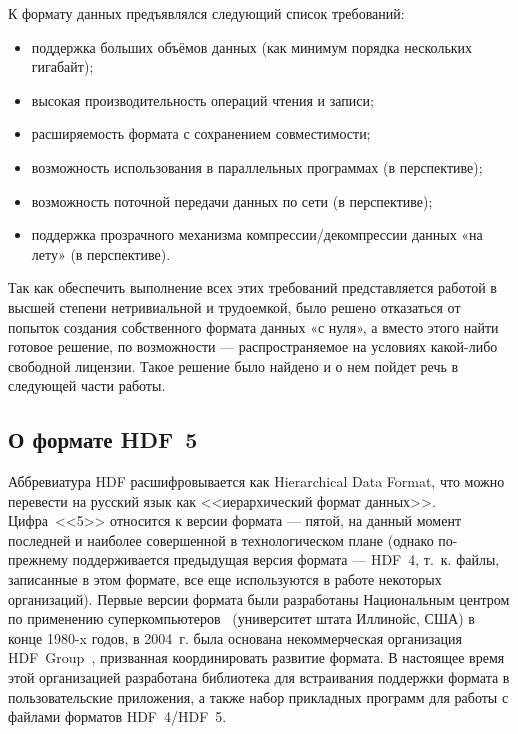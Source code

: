 К формату данных предъявлялся следующий список требований:
\begin{itemize}
\item поддержка больших объёмов данных (как минимум порядка нескольких
      гигабайт);
\item высокая производительность операций чтения и записи;
\item расширяемость формата с сохранением совместимости;
\item возможность использования в параллельных программах (в перспективе);
\item возможность поточной передачи данных по сети (в перспективе);
\item поддержка прозрачного механизма компрессии/декомпрессии данных «на лету»
      (в перспективе).
\end{itemize}

Так как обеспечить выполнение всех этих требований представляется работой
в высшей степени нетривиальной и трудоемкой, было решено отказаться от попыток
создания собственного формата данных «с нуля», а вместо этого найти готовое
решение, по возможности --- распространяемое на условиях какой-либо свободной
лицензии. Такое решение было найдено и о нем пойдет речь в следующей части
работы.


\subsection{О формате HDF~5}

Аббревиатура HDF расшифровывается как Hierarchical Data Format, что можно
перевести на русский язык как <<иерархический формат данных>>. Цифра~<<5>>
относится к версии формата --- пятой, на данный момент последней и наиболее
совершенной в технологическом плане (однако по-прежнему поддерживается
предыдущая версия формата --- HDF~4, т.~к. файлы, записанные в этом формате,
все еще используются в работе некоторых организаций). Первые версии формата
были разработаны Национальным центром по применению
суперкомпьютеров~\cite{bib:NcsaWebsite} (университет штата Иллинойс, США) в конце
1980-x годов, в 2004~г. была основана некоммерческая организация HDF~Group~\cite{bib:HdfGroupWebsite},
призванная координировать развитие формата. В настоящее время этой организацией
разработана библиотека для встраивания поддержки формата в пользовательские
приложения, а также набор прикладных программ для работы с файлами форматов
HDF~4/HDF~5.


